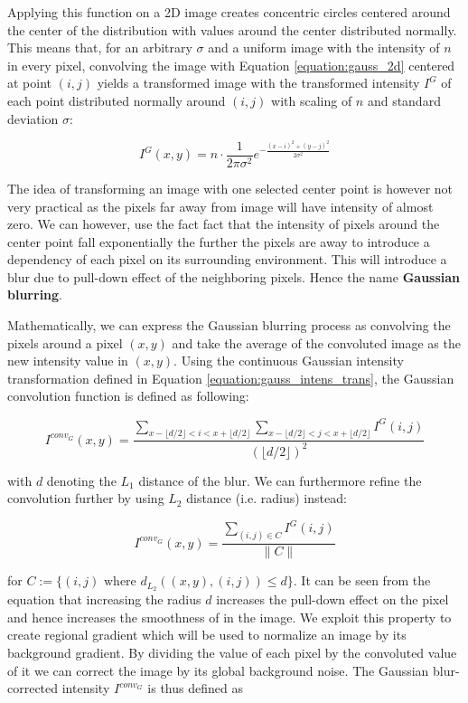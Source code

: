 \documentclass[pdftex,12pt,a4paper]{report}
\begin{document}
Applying this function on a 2D image creates concentric circles centered around the center of the distribution with values around the center distributed normally. This means that, for an arbitrary $\sigma$  and a uniform image with the intensity of $n$ in every pixel,  convolving the image with Equation \ref{equation:gauss_2d} centered at point $(i, j)$ yields a transformed image with the transformed intensity $I^G$ of each point distributed normally around $(i, j)$ with scaling of $n$ and standard deviation $\sigma$:

\begin{equation}
I^G(x, y) = n \cdot \frac{1}{{2\pi \sigma^2}} e^{-\frac{(x - i)^2 + (y - j)^2}{2 \sigma^2}}
\label{equation:gauss_intens_trans}
\end{equation}

The idea of transforming an image with one selected center point is however not very practical as the pixels far away from image will have intensity of almost zero. We can however, use the fact fact that the intensity of pixels around the center point fall exponentially the further the pixels are away to introduce a dependency of each pixel on its surrounding environment. This will introduce a blur due to pull-down effect of the neighboring pixels. Hence the name \textbf{Gaussian blurring}.

Mathematically, we can express the Gaussian blurring process as convolving the pixels around a pixel $(x, y)$ and take the average of the convoluted image as the new intensity value in $(x, y)$. Using the continuous Gaussian intensity transformation defined in Equation \ref{equation:gauss_intens_trans}, the Gaussian convolution  function is defined as following:

$$
I^{conv_G}(x, y) = \frac{\sum_{x - \lfloor d/2 \rfloor < i < x + \lfloor d/2 \rfloor} \sum_{x - \lfloor d/2 \rfloor < j < x + \lfloor d/2 \rfloor} I^G(i, j)}{(\lfloor d/2 \rfloor)^2}
$$

with $d$ denoting the $L_1$ distance of the blur.  We can furthermore refine the convolution further by using $L_2$ distance (i.e. radius) instead:

\begin{equation}
I^{conv_G}(x, y) = \frac{\sum_{(i, j) \in C}  I^G(i, j)}{\| C \|}
\label{equation:conv_gaussian_cont}
\end{equation}

for $C := \{(i, j)  \text{  where } d_{L_2}((x, y), (i, j)) \leq d\}$. It can be seen from the equation that increasing the radius $d$ increases the pull-down effect on the pixel and hence increases the smoothness of in the image. We exploit this property to create regional gradient which will be used to normalize an image by its background gradient. By dividing the value of each pixel by the convoluted value of it we can correct the image by its global background noise. The Gaussian blur-corrected intensity $I^{conv_G}$ is thus defined as
\end{document}
